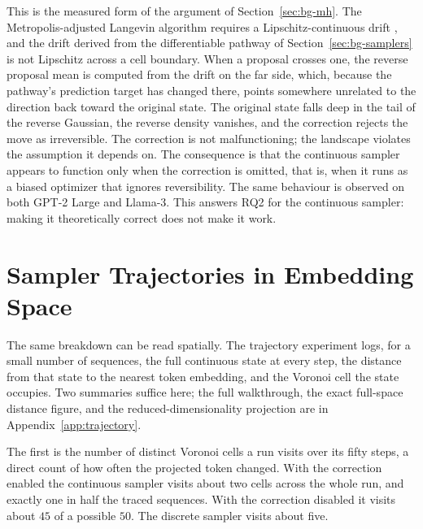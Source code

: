 This is the measured form of the argument of Section~\ref{sec:bg-mh}. The Metropolis-adjusted Langevin algorithm requires a Lipschitz-continuous drift \citep{roberts1996exponential}, and the drift derived from the differentiable pathway of Section~\ref{sec:bg-samplers} is not Lipschitz across a cell boundary. When a proposal crosses one, the reverse proposal mean is computed from the drift on the far side, which, because the pathway's prediction target has changed there, points somewhere unrelated to the direction back toward the original state. The original state falls deep in the tail of the reverse Gaussian, the reverse density vanishes, and the correction rejects the move as irreversible. The correction is not malfunctioning; the landscape violates the assumption it depends on. The consequence is that the continuous sampler appears to function only when the correction is omitted, that is, when it runs as a biased optimizer that ignores reversibility. The same behaviour is observed on both GPT-2 Large and Llama-3. This answers RQ2 for the continuous sampler: making it theoretically correct does not make it work.

\section{Sampler Trajectories in Embedding Space}
\label{sec:results-traj}

The same breakdown can be read spatially. The trajectory experiment logs, for a small number of sequences, the full continuous state at every step, the distance from that state to the nearest token embedding, and the Voronoi cell the state occupies. Two summaries suffice here; the full walkthrough, the exact full-space distance figure, and the reduced-dimensionality projection are in Appendix~\ref{app:trajectory}.

The first is the number of distinct Voronoi cells a run visits over its fifty steps, a direct count of how often the projected token changed. With the correction enabled the continuous sampler visits about two cells across the whole run, and exactly one in half the traced sequences.
With the correction disabled it visits about $45$ of a possible $50$.
The discrete sampler visits about five.

